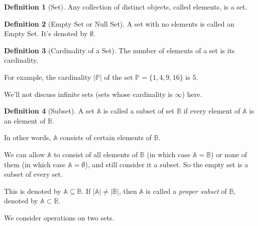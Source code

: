 \documentclass[11pt]{book}
\theoremstyle{definition}
\newtheorem{definition}{Definition}
\theoremstyle{plain}
\theoremstyle{definition}
\theoremstyle{problemstyle}
\theoremstyle{remark}
\theoremstyle{definition}
\begin{document}
\begin{definition}[Set]
Any collection of distinct objects, called elements, is a set.
    \label{def:set}
\end{definition}
\begin{definition}[Empty Set or Null Set]
    A set with no elements is called an Empty Set. It's denoted by $\emptyset$.
    \label{def:empty-set}
\end{definition}
\begin{definition}[Cardinality of a Set]
    \label{def:set-cardinality}
    The number of elements of a set is its cardinality.

    For example, the cardinality $\lvert\mathbb{P}\rvert$ of the set $\mathbb{P}=\{1,4,9,16\}$ is $5$.

    We'll not discuss infinite sets (sets whose cardinality is $\infty$) here.

\end{definition}
\begin{definition}[Subset]
    A set $\mathbb{A}$ is called a subset of set $\mathbb{B}$ if every element of $\mathbb{A}$ is an element of $\mathbb{B}$.

    In other words, $\mathbb{A}$ consists of certain elements of $\mathbb{B}$. 

    We can allow $\mathbb{A}$ to consist of all elements of $\mathbb{B}$ (in which case $\mathbb{A}=\mathbb{B}$) or none of them (in which case $\mathbb{A}=\emptyset$), and still consider it a subset. So the empty set is a subset of every set.

    This is denoted by $\mathbb{A}\subseteq\mathbb{B}$. If $\lvert\mathbb{A}\rvert\ne\lvert\mathbb{B}\rvert$, then $\mathbb{A}$ is called a \emph{proper subset} of $\mathbb{B}$, denoted by $\mathbb{A}\subset\mathbb{B}$.
    \label{def:subset}
\end{definition}

We consider operations on two sets.
\end{document}
